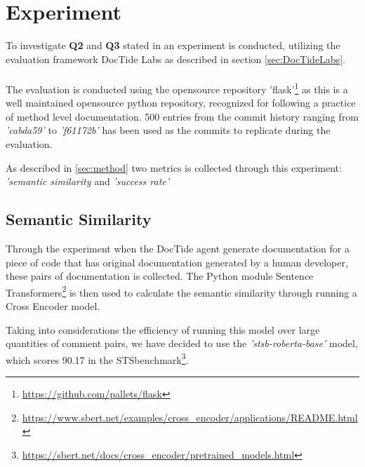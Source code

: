 \section{Experiment}
\label{sec:exp}
To investigate \textbf{Q2} and \textbf{Q3} stated in  an experiment is conducted, utilizing the evaluation framework DocTide Labs as described in section \ref{sec:DocTideLabs}. 
\\ \\
The evaluation is conducted using the opensource repository 'flask'\footnote{\url{https://github.com/pallets/flask}} as this is a well maintained opensource python repository, recognized for following a practice of method level documentation. 500 entries from the commit history ranging from \textit{'cabda59'} to \textit{'f61172b'} has been used as the commits to replicate during the evaluation.

As described in \cref{sec:method} two metrics is collected through this experiment: \textit{'semantic similarity} and \textit{'success rate'}

\subsection{Semantic Similarity}
Through the experiment when the DocTide agent generate documentation for a piece of code that has original documentation generated by a human developer, these pairs of documentation is collected. The Python module Sentence Transformers\footnote{\url{https://www.sbert.net/examples/cross_encoder/applications/README.html}} is then used to calculate the semantic similarity through running a Cross Encoder model.

Taking into considerations the efficiency of running this model over large quantities of comment pairs, we have decided to use the \textit{'stsb-roberta-base'} model, which scores 90.17 in the STSbenchmark\footnote{\url{https://sbert.net/docs/cross_encoder/pretrained_models.html}}.
